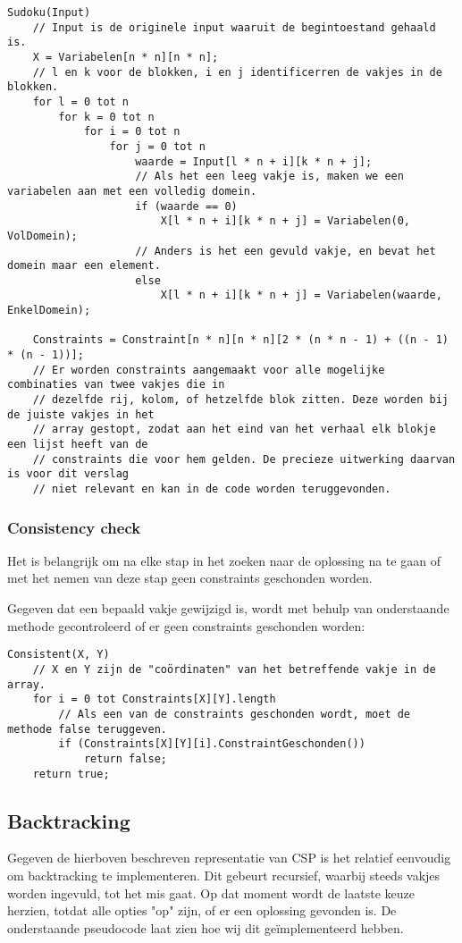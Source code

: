 \documentclass[]{report}
\begin{document}
\begin{minipage}{\textwidth}
\begin{lstlisting}
Sudoku(Input)
	// Input is de originele input waaruit de begintoestand gehaald is.
	X = Variabelen[n * n][n * n];
	// l en k voor de blokken, i en j identificerren de vakjes in de blokken.
	for l = 0 tot n
		for k = 0 tot n
			for i = 0 tot n
				for j = 0 tot n
					waarde = Input[l * n + i][k * n + j];
					// Als het een leeg vakje is, maken we een variabelen aan met een volledig domein.
					if (waarde == 0)
						X[l * n + i][k * n + j] = Variabelen(0, VolDomein);
					// Anders is het een gevuld vakje, en bevat het domein maar een element.
					else
						X[l * n + i][k * n + j] = Variabelen(waarde, EnkelDomein);
						
	Constraints = Constraint[n * n][n * n][2 * (n * n - 1) + ((n - 1) * (n - 1))];
	// Er worden constraints aangemaakt voor alle mogelijke combinaties van twee vakjes die in 
	// dezelfde rij, kolom, of hetzelfde blok zitten. Deze worden bij de juiste vakjes in het 
	// array gestopt, zodat aan het eind van het verhaal elk blokje een lijst heeft van de 
	// constraints die voor hem gelden. De precieze uitwerking daarvan is voor dit verslag 
	// niet relevant en kan in de code worden teruggevonden.
\end{lstlisting}
\end{minipage}

\subsubsection{Consistency check}
Het is belangrijk om na elke stap in het zoeken naar de oplossing na te gaan of met het nemen van deze stap geen constraints geschonden worden.

Gegeven dat een bepaald vakje gewijzigd is, wordt met behulp van onderstaande methode gecontroleerd of er geen constraints geschonden worden:

\begin{minipage}{\textwidth}
\begin{lstlisting}
Consistent(X, Y)
	// X en Y zijn de "coördinaten" van het betreffende vakje in de array.
	for i = 0 tot Constraints[X][Y].length
		// Als een van de constraints geschonden wordt, moet de methode false teruggeven.
		if (Constraints[X][Y][i].ConstraintGeschonden())
			return false;
	return true;
\end{lstlisting}
\end{minipage}

\subsection{Backtracking}
Gegeven de hierboven beschreven representatie van CSP is het relatief eenvoudig om backtracking te implementeren. Dit gebeurt recursief, waarbij steeds vakjes worden ingevuld, tot het mis gaat. Op dat moment wordt de laatste keuze herzien, totdat alle opties "op" zijn, of er een oplossing gevonden is. De onderstaande pseudocode laat zien hoe wij dit ge\"{i}mplementeerd hebben. 
\end{document}
